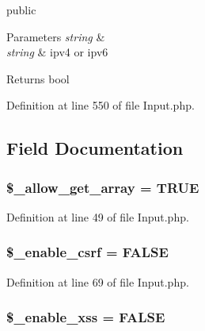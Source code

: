 public 
\begin{DoxyParams}{Parameters}
{\em string} & \\
\hline
{\em string} & ipv4 or ipv6 \\
\hline
\end{DoxyParams}
\begin{DoxyReturn}{Returns}
bool 
\end{DoxyReturn}


Definition at line 550 of file Input.\+php.



\subsection{Field Documentation}
\subsubsection[{\texorpdfstring{\$\+\_\+allow\+\_\+get\+\_\+array}{$_allow_get_array}}]{\setlength{\rightskip}{0pt plus 5cm}\$\+\_\+allow\+\_\+get\+\_\+array = T\+R\+UE}\hypertarget{class_c_i___input_a359b1debb6f1d80e345d6215af6946fb}{}\label{class_c_i___input_a359b1debb6f1d80e345d6215af6946fb}


Definition at line 49 of file Input.\+php.

\subsubsection[{\texorpdfstring{\$\+\_\+enable\+\_\+csrf}{$_enable_csrf}}]{\setlength{\rightskip}{0pt plus 5cm}\$\+\_\+enable\+\_\+csrf = F\+A\+L\+SE}\hypertarget{class_c_i___input_a463c89c07e7cf7f5e4337a2a8e460d17}{}\label{class_c_i___input_a463c89c07e7cf7f5e4337a2a8e460d17}


Definition at line 69 of file Input.\+php.

\subsubsection[{\texorpdfstring{\$\+\_\+enable\+\_\+xss}{$_enable_xss}}]{\setlength{\rightskip}{0pt plus 5cm}\$\+\_\+enable\+\_\+xss = F\+A\+L\+SE}\hypertarget{class_c_i___input_a42b707bea5d9604a7460e953d9e39d7d}{}\label{class_c_i___input_a42b707bea5d9604a7460e953d9e39d7d}


